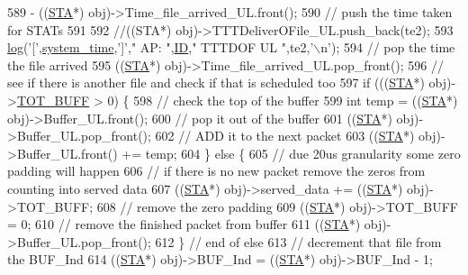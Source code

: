 \begin{DoxyCode}
589                         - ((\hyperlink{classSTA}{STA}*) obj)->Time\_file\_arrived\_UL.front();
590                 \textcolor{comment}{// push the time taken for STATs}
591                 
592                 \textcolor{comment}{//((STA*) obj)->TTTDeliverOFile\_UL.push\_back(te2);}
593                 \hyperlink{AP_8cpp_aa5af53510557e77a03906c5016ebe66f}{log}(\textcolor{charliteral}{'['},\hyperlink{AP_8cpp_aaa03a568dc1d9d3391286ea24b9cfb63}{system\_time},\textcolor{charliteral}{']'},\textcolor{stringliteral}{" AP: "},\hyperlink{classAP_a5f6f67357a37b369b8967ce354ede5dd}{ID},\textcolor{stringliteral}{" TTTDOF UL "},te2,\textcolor{charliteral}{'\(\backslash\)n'});
594                 \textcolor{comment}{// pop the time the file arrived}
595                 ((\hyperlink{classSTA}{STA}*) obj)->Time\_file\_arrived\_UL.pop\_front();
596                 \textcolor{comment}{// see if there is another file and check if that is scheduled too}
597                 \textcolor{keywordflow}{if} (((\hyperlink{classSTA}{STA}*) obj)->\hyperlink{classAP_a03aea575eb6665fe9498fd30352e1d35}{TOT\_BUFF} > 0) \{
598                     \textcolor{comment}{// check the top of the buffer}
599                     \textcolor{keywordtype}{int} temp = ((\hyperlink{classSTA}{STA}*) obj)->Buffer\_UL.front();
600                     \textcolor{comment}{// pop it out of the buffer}
601                     ((\hyperlink{classSTA}{STA}*) obj)->Buffer\_UL.pop\_front();
602                     \textcolor{comment}{// ADD it to the next packet}
603                     ((\hyperlink{classSTA}{STA}*) obj)->Buffer\_UL.front() += temp;
604                 \} \textcolor{keywordflow}{else} \{
605                     \textcolor{comment}{// due 20us granularity some zero padding will happen}
606                     \textcolor{comment}{// if there is no new packet remove the zeros from counting into served data}
607                     ((\hyperlink{classSTA}{STA}*) obj)->served\_data += ((\hyperlink{classSTA}{STA}*) obj)->TOT\_BUFF;
608                     \textcolor{comment}{// remove the zero padding}
609                     ((\hyperlink{classSTA}{STA}*) obj)->TOT\_BUFF = 0;
610                     \textcolor{comment}{// remove the finished packet from buffer}
611                     ((\hyperlink{classSTA}{STA}*) obj)->Buffer\_UL.pop\_front();
612                 \} \textcolor{comment}{// end of else}
613                   \textcolor{comment}{// decrement that file from the BUF\_Ind}
614                 ((\hyperlink{classSTA}{STA}*) obj)->BUF\_Ind = ((\hyperlink{classSTA}{STA}*) obj)->BUF\_Ind - 1;

\end{DoxyCode}
